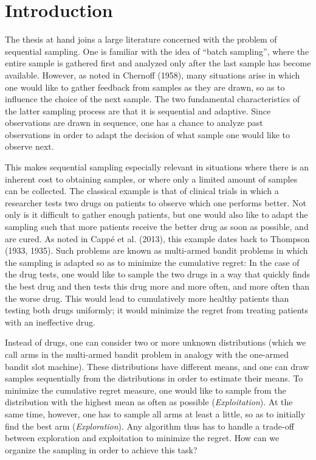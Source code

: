 \documentclass[11pt,]{article}
\begin{document}

\section{\texorpdfstring{Introduction
\label{chap:Introduction}}{Introduction }}\label{introduction}

The thesis at hand joins a large literature concerned with the problem
of sequential sampling. One is familiar with the idea of ``batch
sampling'', where the entire sample is gathered first and analyzed only
after the last sample has become available. However, as noted in
Chernoff (1958), many situations arise in which one would like to gather
feedback from samples as they are drawn, so as to influence the choice
of the next sample. The two fundamental characteristics of the latter
sampling process are that it is sequential and adaptive. Since
observations are drawn in sequence, one has a chance to analyze past
observations in order to adapt the decision of what sample one would
like to observe next.

This makes sequential sampling especially relevant in situations where
there is an inherent cost to obtaining samples, or where only a limited
amount of samples can be collected. The classical example is that of
clinical trials in which a researcher tests two drugs on patients to
observe which one performs better. Not only is it difficult to gather
enough patients, but one would also like to adapt the sampling such that
more patients receive the better drug as soon as possible, and are
cured. As noted in Cappé et al. (2013), this example dates back to
Thompson (1933, 1935). Such problems are known as multi-armed bandit
problems in which the sampling is adapted so as to minimize the
cumulative regret: In the case of the drug tests, one would like to
sample the two drugs in a way that quickly finds the best drug and then
tests this drug more and more often, and more often than the worse drug.
This would lead to cumulatively more healthy patients than testing both
drugs uniformly; it would minimize the regret from treating patients
with an ineffective drug.

Instead of drugs, one can consider two or more unknown distributions
(which we call arms in the multi-armed bandit problem in analogy with
the one-armed bandit slot machine). These distributions have different
means, and one can draw samples sequentially from the distributions in
order to estimate their means. To minimize the cumulative regret
measure, one would like to sample from the distribution with the highest
mean as often as possible (\emph{Exploitation}). At the same time,
however, one has to sample all arms at least a little, so as to
initially find the best arm (\emph{Exploration}). Any algorithm thus has
to handle a trade-off between exploration and exploitation to minimize
the regret. How can we organize the sampling in order to achieve this
task?
\end{document}
